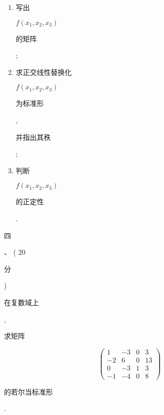 \documentclass[10pt]{article}
\begin{document}
\begin{enumerate}
  \item \begin{CJK}{UTF8}{mj}写出\end{CJK} $f\left(x_{1}, x_{2}, x_{3}\right)$ \begin{CJK}{UTF8}{mj}的矩阵\end{CJK};

  \item \begin{CJK}{UTF8}{mj}求正交线性替换化\end{CJK} $f\left(x_{1}, x_{2}, x_{3}\right)$ \begin{CJK}{UTF8}{mj}为标准形\end{CJK}, \begin{CJK}{UTF8}{mj}并指出其秩\end{CJK};

  \item \begin{CJK}{UTF8}{mj}判断\end{CJK} $f\left(x_{1}, x_{2}, x_{3}\right)$ \begin{CJK}{UTF8}{mj}的正定性\end{CJK}.

\end{enumerate}
\begin{CJK}{UTF8}{mj}四\end{CJK}、 ( 20 \begin{CJK}{UTF8}{mj}分\end{CJK}) \begin{CJK}{UTF8}{mj}在复数域上\end{CJK}, \begin{CJK}{UTF8}{mj}求矩阵\end{CJK}
$$
\left(\begin{array}{cccc}
1 & -3 & 0 & 3 \\
-2 & 6 & 0 & 13 \\
0 & -3 & 1 & 3 \\
-1 & -4 & 0 & 8
\end{array}\right)
$$
\begin{CJK}{UTF8}{mj}的若尔当标准形\end{CJK}.
\end{document}
